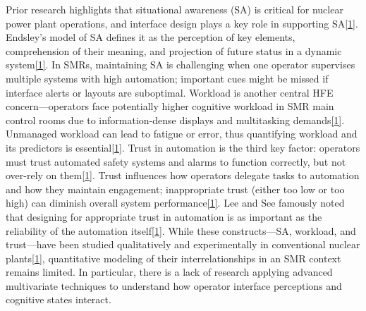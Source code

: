 \documentclass[conference]{IEEEtran}
\begin{document}
Prior research highlights that situational awareness (SA) is critical for nuclear power plant operations, and interface design plays a key role in supporting SA\href{https://www.researchgate.net/publication/337420277_Designing_for_Situation_Awareness_in_the_Main_Control_Room_of_a_Small_Modular_Reactor}{[1]}. Endsley’s model of SA defines it as the perception of key elements, comprehension of their meaning, and projection of future status in a dynamic system\href{https://www.researchgate.net/publication/337420277_Designing_for_Situation_Awareness_in_the_Main_Control_Room_of_a_Small_Modular_Reactor}{[1]}. In SMRs, maintaining SA is challenging when one operator supervises multiple systems with high automation; important cues might be missed if interface alerts or layouts are suboptimal. Workload is another central HFE concern—operators face potentially higher cognitive workload in SMR main control rooms due to information-dense displays and multitasking demands\href{https://www.researchgate.net/publication/337420277_Designing_for_Situation_Awareness_in_the_Main_Control_Room_of_a_Small_Modular_Reactor}{[1]}. Unmanaged workload can lead to fatigue or error, thus quantifying workload and its predictors is essential\href{https://www.researchgate.net/publication/337420277_Designing_for_Situation_Awareness_in_the_Main_Control_Room_of_a_Small_Modular_Reactor}{[1]}. Trust in automation is the third key factor: operators must trust automated safety systems and alarms to function correctly, but not over-rely on them\href{https://www.researchgate.net/publication/337420277_Designing_for_Situation_Awareness_in_the_Main_Control_Room_of_a_Small_Modular_Reactor}{[1]}. Trust influences how operators delegate tasks to automation and how they maintain engagement; inappropriate trust (either too low or too high) can diminish overall system performance\href{https://www.researchgate.net/publication/337420277_Designing_for_Situation_Awareness_in_the_Main_Control_Room_of_a_Small_Modular_Reactor}{[1]}. Lee and See famously noted that designing for appropriate trust in automation is as important as the reliability of the automation itself\href{https://www.researchgate.net/publication/337420277_Designing_for_Situation_Awareness_in_the_Main_Control_Room_of_a_Small_Modular_Reactor}{[1]}. While these constructs—SA, workload, and trust—have been studied qualitatively and experimentally in conventional nuclear plants\href{https://www.researchgate.net/publication/337420277_Designing_for_Situation_Awareness_in_the_Main_Control_Room_of_a_Small_Modular_Reactor}{[1]}, quantitative modeling of their interrelationships in an SMR context remains limited. In particular, there is a lack of research applying advanced multivariate techniques to understand how operator interface perceptions and cognitive states interact.
\end{document}
